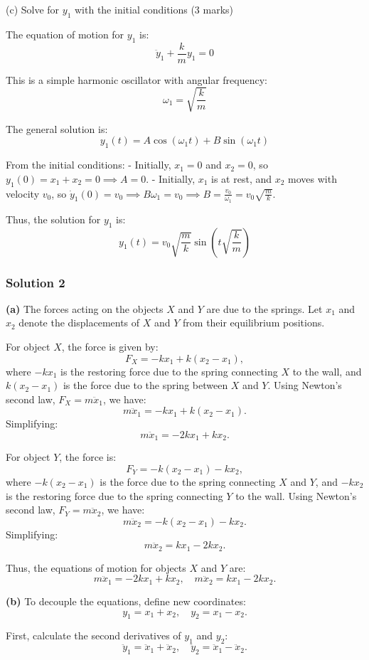 \documentclass{article}
\begin{document}
(c) Solve for $y_1$ with the initial conditions (3 marks)

The equation of motion for $y_1$ is:
\[
\ddot{y}_1 + \frac{k}{m} y_1 = 0
\]

This is a simple harmonic oscillator with angular frequency:
\[
\omega_1 = \sqrt{\frac{k}{m}}
\]

The general solution is:
\[
y_1(t) = A \cos(\omega_1 t) + B \sin(\omega_1 t)
\]

From the initial conditions:
- Initially, $x_1 = 0$ and $x_2 = 0$, so $y_1(0) = x_1 + x_2 = 0 \implies A = 0$.
- Initially, $x_1$ is at rest, and $x_2$ moves with velocity $v_0$, so $\dot{y}_1(0) = v_0 \implies B \omega_1 = v_0 \implies B = \frac{v_0}{\omega_1} = v_0 \sqrt{\frac{m}{k}}$.

Thus, the solution for $y_1$ is:
\[
y_1(t) = v_0 \sqrt{\frac{m}{k}} \sin\left(t \sqrt{\frac{k}{m}}\right)
\]

\subsubsection{Solution 2}
\textbf{(a)} The forces acting on the objects $X$ and $Y$ are due to the springs. Let $x_1$ and $x_2$ denote the displacements of $X$ and $Y$ from their equilibrium positions.

For object $X$, the force is given by:
\[
F_X = -k x_1 + k (x_2 - x_1),
\]
where $-k x_1$ is the restoring force due to the spring connecting $X$ to the wall, and $k (x_2 - x_1)$ is the force due to the spring between $X$ and $Y$. Using Newton's second law, $F_X = m \ddot{x}_1$, we have:
\[
m \ddot{x}_1 = -k x_1 + k (x_2 - x_1).
\]
Simplifying:
\[
m \ddot{x}_1 = -2k x_1 + k x_2. \tag{1}
\]

For object $Y$, the force is:
\[
F_Y = -k (x_2 - x_1) - k x_2,
\]
where $-k (x_2 - x_1)$ is the force due to the spring connecting $X$ and $Y$, and $-k x_2$ is the restoring force due to the spring connecting $Y$ to the wall. Using Newton's second law, $F_Y = m \ddot{x}_2$, we have:
\[
m \ddot{x}_2 = -k (x_2 - x_1) - k x_2.
\]
Simplifying:
\[
m \ddot{x}_2 = k x_1 - 2k x_2. \tag{2}
\]

Thus, the equations of motion for objects $X$ and $Y$ are:
\[
\boxed{m \ddot{x}_1 = -2k x_1 + k x_2, \quad m \ddot{x}_2 = k x_1 - 2k x_2.}
\]

\textbf{(b)} To decouple the equations, define new coordinates:
\[
y_1 = x_1 + x_2, \quad y_2 = x_1 - x_2.
\]

First, calculate the second derivatives of $y_1$ and $y_2$:
\[
\ddot{y}_1 = \ddot{x}_1 + \ddot{x}_2, \quad \ddot{y}_2 = \ddot{x}_1 - \ddot{x}_2.
\]
\end{document}
